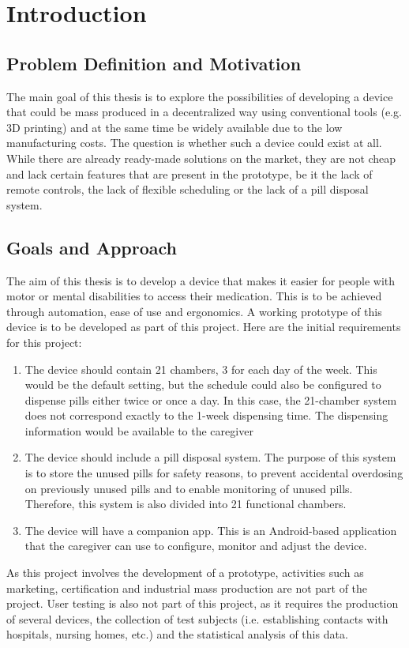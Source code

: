 \section{Introduction}
\subsection{Problem Definition and Motivation}
The main goal of this thesis is to explore the possibilities of developing a device that could be mass produced in a decentralized way using conventional tools (e.g. 3D printing) and at the same time be widely available due to the low manufacturing costs. The question is whether such a device could exist at all. While there are already ready-made solutions on the market, they are not cheap and lack certain features that are present in the prototype, be it the lack of remote controls, the lack of flexible scheduling or the lack of a pill disposal system.

\subsection{Goals and Approach}
   The aim of this thesis is to develop a device that makes it easier for people with motor or mental disabilities to access their medication. This is to be achieved through automation, ease of use and ergonomics. A working prototype of this device is to be developed as part of this project. Here are the initial requirements for this project:
   \begin{enumerate}
   	
   	\item The device should contain 21 chambers, 3 for each day of the week. This would be the default setting, but the schedule could also be configured to dispense pills either twice or once a day. In this case, the 21-chamber system does not correspond exactly to the 1-week dispensing time. The dispensing information would be available to the caregiver
   	\item The device should include a pill disposal system. The purpose of this system is to store the unused pills for safety reasons, to prevent accidental overdosing on previously unused pills and to enable monitoring of unused pills. Therefore, this system is also divided into 21 functional chambers.
   	\item The device will have a companion app. This is an Android-based application that the caregiver can use to configure, monitor and adjust the device.
\end{enumerate}
 As this project involves the development of a prototype, activities such as marketing, certification and industrial mass production are not part of the project.
User testing is also not part of this project, as it requires the production of several devices, the collection of test subjects (i.e. establishing contacts with hospitals, nursing homes, etc.) and the statistical analysis of this data.

